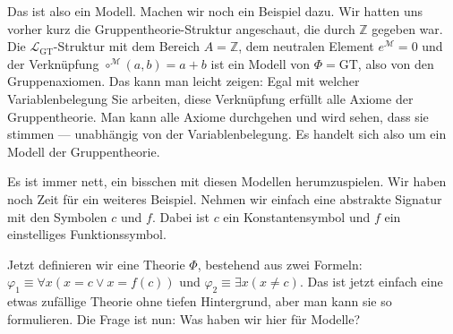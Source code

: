 \begin{math-stroke}
\end{math-stroke}

\begin{spoken-clean}[01:06:33 - 01:08:33]
Das ist also ein Modell. Machen wir noch ein Beispiel dazu. Wir hatten uns vorher kurz die Gruppentheorie-Struktur angeschaut, die durch $\mathbb{Z}$ gegeben war. Die $\mathcal{L}_{\text{GT}}$-Struktur mit dem Bereich $A = \mathbb{Z}$, dem neutralen Element $e^{\mathcal{M}} = 0$ und der Verknüpfung $\circ^{\mathcal{M}}(a, b) = a + b$ ist ein Modell von $\Phi = \text{GT}$, also von den Gruppenaxiomen. Das kann man leicht zeigen: Egal mit welcher Variablenbelegung Sie arbeiten, diese Verknüpfung erfüllt alle Axiome der Gruppentheorie. Man kann alle Axiome durchgehen und wird sehen, dass sie stimmen --- unabhängig von der Variablenbelegung. Es handelt sich also um ein Modell der Gruppentheorie.
\end{spoken-clean}

\begin{math-stroke}
\end{math-stroke}

\begin{spoken-clean}[01:08:33 - 01:10:33]
Es ist immer nett, ein bisschen mit diesen Modellen herumzuspielen. Wir haben noch Zeit für ein weiteres Beispiel. Nehmen wir einfach eine abstrakte Signatur mit den Symbolen $c$ und $f$. Dabei ist $c$ ein Konstantensymbol und $f$ ein einstelliges Funktionssymbol.

Jetzt definieren wir eine Theorie $\Phi$, bestehend aus zwei Formeln: $\varphi_1 \equiv \forall x (x = c \lor x = f(c))$ und $\varphi_2 \equiv \exists x (x \neq c)$. Das ist jetzt einfach eine etwas zufällige Theorie ohne tiefen Hintergrund, aber man kann sie so formulieren. Die Frage ist nun: Was haben wir hier für Modelle?
\end{spoken-clean}

